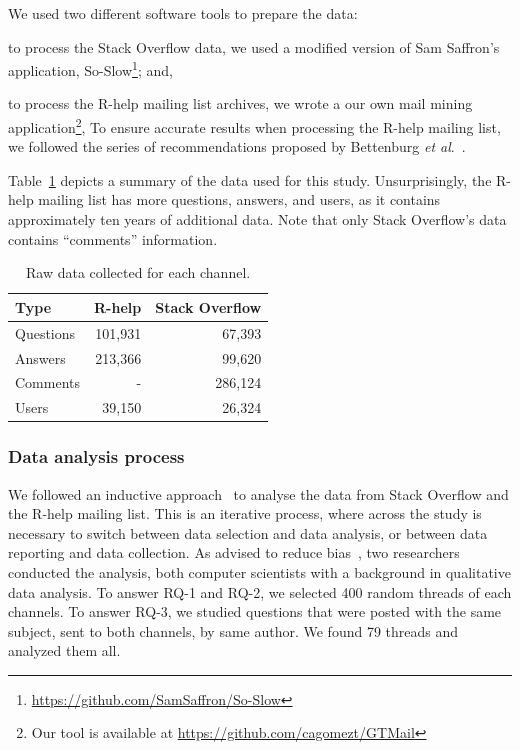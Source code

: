 We used two different software tools to prepare the data:
    \begin{enumerate*}[label=(\arabic*)]
    \item to process the Stack Overflow data, we used a modified version of Sam Saffron's application, So-Slow\footnote{\url{https://github.com/SamSaffron/So-Slow}}; and,
    \item to process the R-help mailing list archives, we wrote a our own mail mining application\footnote{Our tool is available at
            \url{https://github.com/cagomezt/GTMail}}, To ensure accurate results when processing the R-help mailing list, we followed the series of recommendations proposed by Bettenburg \textit{et al}.~\cite{Bettenburg2009}.
    \end{enumerate*}
Table~\ref{table:data} depicts a summary of the data used for this study. Unsurprisingly, the R-help mailing list has more questions, answers, and users, as it contains approximately ten years of additional data.
Note that only Stack Overflow's data contains ``comments'' information.

	\begin{table}[!htb]
	  \centering
      \caption{Raw data collected for each channel.}
      \begin{small}
        \begin{tabular}{lrr}
	        \toprule
	        Type          &  R-help & Stack Overflow \\
	        \midrule
	        Questions     & 101,931 &  67,393 \\
	        Answers       & 213,366 &  99,620 \\
	        Comments      &       - & 286,124 \\
	        Users         &  39,150 &  26,324 \\
	        \bottomrule
        \end{tabular}
      \end{small}
	  \label{table:data}
	\end{table}





\subsubsection{Data analysis process}
\label{sec:dap}

    We followed an inductive approach~\cite{Runeson2012} to analyse the data from Stack Overflow and the R-help mailing list. 
    This is an iterative process, where across the study is necessary to switch between data selection and data analysis, or between data reporting and data collection.
    As advised to reduce bias~\cite{Runeson2012}, two researchers conducted the analysis, both computer scientists with a background in qualitative data analysis.
To answer RQ-1 and RQ-2, we selected 400 random threads of each channels.
To answer RQ-3, we studied questions that were posted with the same subject, sent to both channels, by same author. We found 79 threads and analyzed them all.
    
